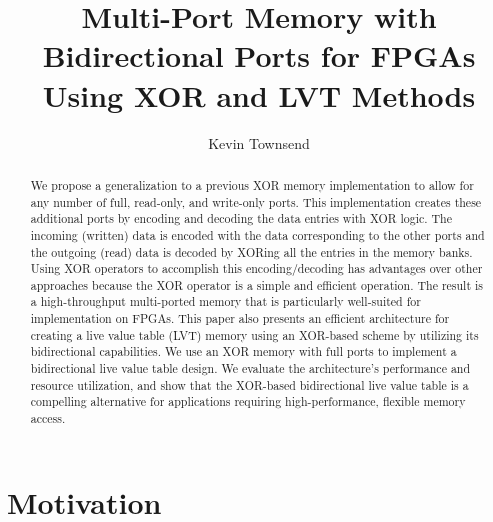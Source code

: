 \documentclass[sigconf,nonacm]{acmart}
\begin{document}
\title{Multi-Port Memory with Bidirectional Ports for FPGAs Using XOR and LVT Methods}

\author{Kevin Townsend}

\renewcommand{\shortauthors}{Townsend}

\begin{abstract}
  We propose a generalization to a previous XOR memory implementation to allow for any number of full, read-only, and write-only ports.
This implementation creates these additional ports by encoding and decoding the data entries with XOR logic. The incoming (written) data is encoded with the data corresponding to the other ports and the outgoing (read) data is decoded by XORing all the entries in the memory banks.
Using XOR operators to accomplish this encoding/decoding has advantages over other approaches because the XOR operator is a simple and efficient operation.
The result is a high-throughput multi-ported memory that is particularly well-suited for implementation on FPGAs.
This paper also presents an efficient architecture for creating a live value table (LVT) memory using an XOR-based scheme by utilizing its bidirectional capabilities.
We use an XOR memory with full ports to implement a bidirectional live value table design.
We evaluate the architecture's performance and resource utilization, and show that the XOR-based bidirectional live value table is a compelling alternative for applications requiring high-performance, flexible memory access.
\end{abstract}

\maketitle

\section{Motivation}
\end{document}
